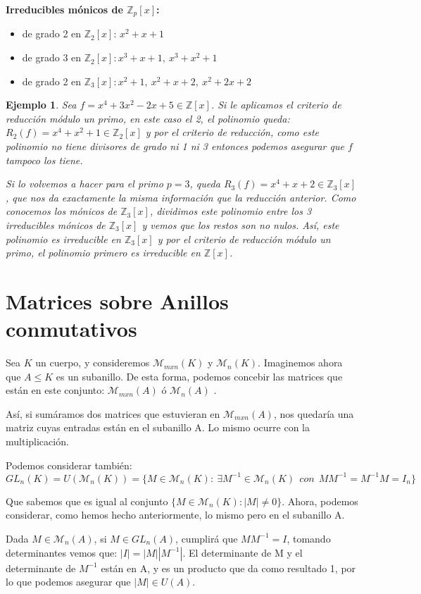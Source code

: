 \documentclass[11pt, a4paper, titlepage]{article}
\newif\IfInSansMode
\providecommand{\ent}{\mathbb{Z}}
\theoremstyle{theorem-style}
\theoremstyle{definition-style}
\theoremstyle{remark-style}
\theoremstyle{example-style}
\newtheorem{ejemplo}{Ejemplo}[section]
\begin{document}
\textbf{Irreducibles mónicos de $\ent_p[x]$:}
\begin{itemize}
	\item de grado 2 en $\ent_2[x]$: $x^2+x+1$
	\item de grado 3 en $\ent_2[x]: x^3+x+1,\ x^3+x^2+1$
	\item de grado 2 en $\ent_3[x]: x^2+1,\ x^2+x+2,\ x^2+2x+2$
\end{itemize}
\begin{ejemplo}
	Sea $f = x^4 +3x^2 -2x +5 \in \ent[x]$. Si le aplicamos el criterio de reducción módulo un primo, en este caso el 2, el polinomio queda: $R_2(f) = x^4 + x^2 +1 \in \ent_2[x]$ y por el criterio de reducción, como este polinomio no tiene divisores de grado ni 1 ni 3 entonces podemos asegurar que $f$ tampoco los tiene.

	Si lo volvemos a hacer para el primo $p=3$, queda $R_3(f) = x^4 + x + 2 \in \ent_3[x]$ , que nos da exactamente la misma información que la reducción anterior. Como conocemos los mónicos de $\ent_3[x]$, dividimos este polinomio entre los 3 irreducibles mónicos de $\ent_3[x]$ y vemos que los restos son no nulos. Así, este polinomio es irreducible en $\ent_3[x]$ y por el criterio de reducción módulo un primo, el polinomio primero es irreducible en $\ent[x]$.
\end{ejemplo}



\section{Matrices sobre Anillos conmutativos}
Sea $K$ un cuerpo, y consideremos $\mathcal{M}_{mxn}(K)$ y  $\mathcal{M}_{n}(K)$. Imaginemos ahora que $A\leq K$ es un subanillo. De esta forma, podemos concebir las matrices que están en este conjunto: $\mathcal{M}_{mxn}(A)$ ó  $\mathcal{M}_{n}(A)$ .

Así, si sumáramos dos matrices que estuvieran en  $\mathcal{M}_{mxn}(A)$, nos quedaría una matriz cuyas entradas están en el subanillo A. Lo mismo ocurre con la multiplicación.


Podemos considerar también:
\[
GL_n(K) = U (\mathcal{M}_n(K)) = \{ M \in \mathcal{M}_n(K) :  \ \exists M^{-1} \in \mathcal{M}_n(K) \ \ con \ \ MM^{-1} = M^{-1}M = I_n\}
\]

Que sabemos que es igual al conjunto $\{M \in \mathcal{M}_n(K) : | M | \ne 0\}$. Ahora, podemos considerar, como hemos hecho anteriormente, lo mismo pero en el subanillo A.

Dada $M \in \mathcal{M}_n(A)$, si $M \in GL_n(A)$, cumplirá que $MM^{-1} = I$, tomando determinantes vemos que: $|I|=|M||M^{-1}|$. El determinante de M y el determinante de $M^{-1}$ están en A, y es un producto que da como resultado 1, por lo que podemos asegurar que $|M| \in U(A)$.
\end{document}
